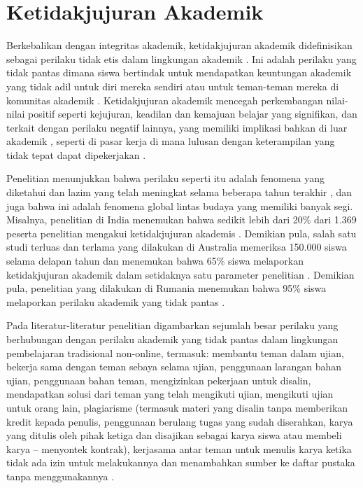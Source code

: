 \section{Ketidakjujuran Akademik}
\label{sec:ketidakjujuranakademik}

Berkebalikan dengan integritas akademik, ketidakjujuran akademik didefinisikan sebagai perilaku tidak etis dalam lingkungan akademik \citep{muhammad2020factors}. Ini adalah perilaku yang tidak pantas dimana siswa bertindak untuk mendapatkan keuntungan akademik yang tidak adil untuk diri mereka sendiri atau untuk teman-teman mereka di komunitas akademik \citep{grira2019rationality}. Ketidakjujuran akademik mencegah perkembangan nilai-nilai positif seperti kejujuran, keadilan dan kemajuan belajar yang signifikan, dan terkait dengan perilaku negatif lainnya, yang memiliki implikasi bahkan di luar akademik \citet{krou2020achievement} \citep{yu2018college}, seperti di pasar kerja di mana lulusan dengan keterampilan yang tidak tepat dapat dipekerjakan \citep{barbaranelli2018machiavellian} \citep{bashir2018development}.

Penelitian menunjukkan bahwa perilaku seperti itu adalah fenomena yang diketahui dan lazim yang telah meningkat selama beberapa tahun terakhir \citep{birks2020managing} \citep{grira2019rationality} \citep{harper2021detecting}, dan juga bahwa ini adalah fenomena global lintas budaya yang memiliki banyak segi. Misalnya, penelitian di India menemukan bahwa sedikit lebih dari 20\% dari 1.369 peserta penelitian mengakui ketidakjujuran akademis \citep{stearns2001student}. Demikian pula, salah satu studi terluas dan terlama yang dilakukan di Australia memeriksa 150.000 siswa selama delapan tahun dan menemukan bahwa 65\% siswa melaporkan ketidakjujuran akademik dalam setidaknya satu parameter penelitian \citep{duff2006international}. Demikian pula, penelitian yang dilakukan di Rumania menemukan bahwa 95\% siswa melaporkan perilaku akademik yang tidak pantas \citep{ives2017patterns}.

Pada literatur-literatur penelitian digambarkan sejumlah besar perilaku yang berhubungan dengan perilaku akademik yang tidak pantas dalam lingkungan pembelajaran tradisional non-online, termasuk: membantu teman dalam ujian, bekerja sama dengan teman sebaya selama ujian, penggunaan larangan bahan ujian, penggunaan bahan teman, mengizinkan pekerjaan untuk disalin, mendapatkan solusi dari teman yang telah mengikuti ujian, mengikuti ujian untuk orang lain, plagiarisme (termasuk materi yang disalin tanpa memberikan kredit kepada penulis, penggunaan berulang tugas yang sudah diserahkan, karya yang ditulis oleh pihak ketiga dan disajikan sebagai karya siswa atau membeli karya – menyontek kontrak), kerjasama antar teman untuk menulis karya ketika tidak ada izin untuk melakukannya dan menambahkan sumber ke daftar pustaka tanpa menggunakannya \citep{denisova2017challenges} \citep{harper2021detecting} \citep{von2001can} \citep{yu2018college}.  

